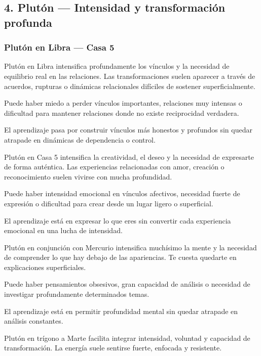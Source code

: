 \documentclass[11pt,a4paper]{article}
\begin{document}
\vspace{0.8cm}

\subsection{4. Plutón — Intensidad y transformación profunda}

\subsubsection*{Plutón en Libra — Casa 5}

Plutón en Libra intensifica profundamente los vínculos y la necesidad de equilibrio real en las relaciones. Las transformaciones suelen aparecer a través de acuerdos, rupturas o dinámicas relacionales difíciles de sostener superficialmente.

Puede haber miedo a perder vínculos importantes, relaciones muy intensas o dificultad para mantener relaciones donde no existe reciprocidad verdadera.

El aprendizaje pasa por construir vínculos más honestos y profundos sin quedar atrapade en dinámicas de dependencia o control.

Plutón en Casa 5 intensifica la creatividad, el deseo y la necesidad de expresarte de forma auténtica. Las experiencias relacionadas con amor, creación o reconocimiento suelen vivirse con mucha profundidad.

Puede haber intensidad emocional en vínculos afectivos, necesidad fuerte de expresión o dificultad para crear desde un lugar ligero o superficial.

El aprendizaje está en expresar lo que eres sin convertir cada experiencia emocional en una lucha de intensidad.

Plutón en conjunción con Mercurio intensifica muchísimo la mente y la necesidad de comprender lo que hay debajo de las apariencias. Te cuesta quedarte en explicaciones superficiales.

Puede haber pensamientos obsesivos, gran capacidad de análisis o necesidad de investigar profundamente determinados temas.

El aprendizaje está en permitir profundidad mental sin quedar atrapade en análisis constantes.

Plutón en trígono a Marte facilita integrar intensidad, voluntad y capacidad de transformación. La energía suele sentirse fuerte, enfocada y resistente.
\end{document}
